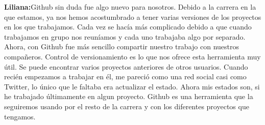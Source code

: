 \documentclass[12pt]{report}
\begin{document}
	\newline
	\newline
\textbf{Liliana:\newline\newline}Github sin duda fue algo nuevo para nosotros. Debido a la carrera en la que estamos, ya nos hemos acostumbrado a tener varias versiones de los proyectos en los que trabajamos. Cada vez se hacía más complicado debido a que cuando trabajamos en grupo nos reuníamos y cada uno trabajaba algo por separado. 
\newline
\newline
Ahora, con Github fue más sencillo compartir nuestro trabajo con nuestros compañeros.
\newline
	\newline
Control de versionamiento es lo que nos ofrece esta herramienta muy útil. Se puede encontrar varios proyectos anteriores de otros usuarios. 
\newline
\newline
Cuando recién empezamos a trabajar en él, me pareció como una red social casi como Twitter, lo único que le faltaba era actualizar el estado. Ahora mis estados son, si he trabajado últimamente en algun proyecto.
\newline
\newline
Github es una herramienta que la seguiremos usando por el resto de la carrera y con los diferentes proyectos que tengamos.
\end{document}
